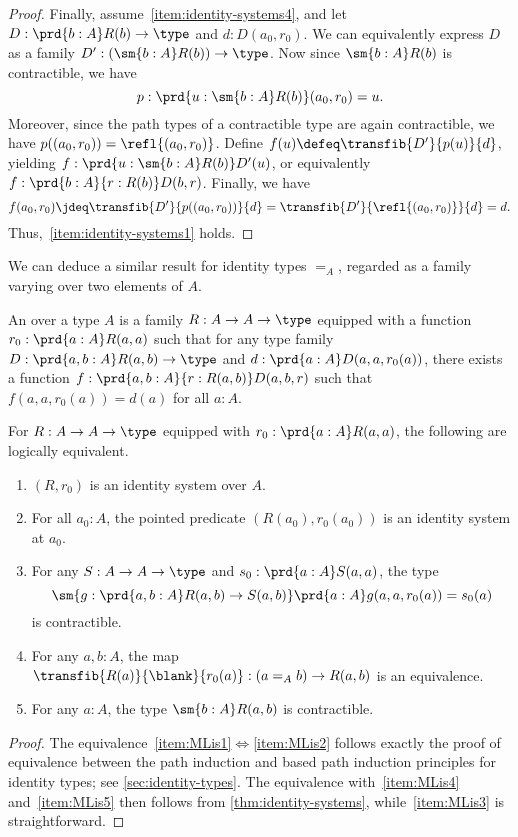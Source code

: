 \begin{proof}
  Finally, assume~\ref{item:identity-systems4}, and let $D:\prd{b:A} R(b)\to  \type$ and $d:D(a_0,r_0)$.
  We can equivalently express $D$ as a family $D':(\sm{b:A} R(b)) \to \type$.
  Now since $\sm{b:A} R(b)$ is contractible, we have
  \[p:\prd{u:\sm{b:A} R(b)} (a_0,r_0) = u. \]
  Moreover, since the path types of a contractible type are again contractible, we have $p((a_0,r_0)) = \refl{(a_0,r_0)}$.
  Define $f(u) \defeq \transfib{D'}{p(u)}{d}$, yielding $f:\prd{u:\sm{b:A} R(b)} D'(u)$, or equivalently $f:\prd{b:A}{r:R(b)} D(b,r)$.
  Finally, we have
  \[f(a_0,r_0) \jdeq \transfib{D'}{p((a_0,r_0))}{d} = \transfib{D'}{\refl{(a_0,r_0)}}{d} = d.\]
  Thus,~\ref{item:identity-systems1} holds.
\end{proof}

%

We can deduce a similar result for identity types $=_A$, regarded as a family varying over two elements of $A$.

%

\begin{defn}
  An 
  over a type $A$ is a family $R:A\to A\to \type$ equipped with a function $r_0:\prd{a:A} R(a,a)$ such that for any type family $D:\prd{a,b:A} R(a,b) \to \type$ and $d:\prd{a:A} D(a,a,r_0(a))$, there exists a function $f:\prd{a,b:A}{r:R(a,b)} D(a,b,r)$ such that $f(a,a,r_0(a))=d(a)$ for all $a:A$.
\end{defn}

\begin{thm}\label{thm:ML-identity-systems}
  For $R:A\to A\to\type$ equipped with $r_0:\prd{a:A} R(a,a)$, the following are logically equivalent.
  \begin{enumerate}
  \item $(R,r_0)$ is an identity system over $A$.\label{item:MLis1}
  \item For all $a_0:A$, the pointed predicate $(R(a_0),r_0(a_0))$ is an identity system at $a_0$.\label{item:MLis2}
  \item For any $S:A\to A\to\type$ and $s_0:\prd{a:A} S(a,a)$, the type
    \[ \sm{g:\prd{a,b:A} R(a,b) \to S(a,b)} \prd{a:A} g(a,a,r_0(a)) = s_0(a) \]
    is contractible.\label{item:MLis3}
  \item For any $a,b:A$, the map $\transfib{R(a)}{\blank}{r_0(a)} : (a =_A b) \to R(a,b)$ is an equivalence.\label{item:MLis4}
  \item For any $a:A$, the type $\sm{b:A} R(a,b)$ is contractible.\label{item:MLis5}
  \end{enumerate}
\end{thm}
\begin{proof}
  The equivalence~\ref{item:MLis1}$\Leftrightarrow$\ref{item:MLis2} follows exactly the proof of equivalence between the path induction and based path induction principles for identity types; see \cref{sec:identity-types}.
  The equivalence with~\ref{item:MLis4} and~\ref{item:MLis5} then follows from \cref{thm:identity-systems}, while~\ref{item:MLis3} is straightforward.
\end{proof}

